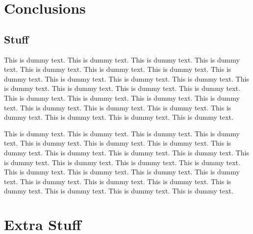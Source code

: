 \documentclass{book}
\begin{document}
\chapter{Conclusions}\label{Conclusions}

\section{Stuff}
This is dummy text. This is dummy text. This is dummy text. This is dummy text. This is dummy text. This is dummy text. This is dummy text. This is dummy text. This is dummy text. This is dummy text. This is dummy text. This is dummy text. This is dummy text. This is dummy text. This is dummy text. This is dummy text. This is dummy text. This is dummy text. This is dummy text. This is dummy text. This is dummy text. This is dummy text. This is dummy text. This is dummy text. This is dummy text. This is dummy text. 

This is dummy text. This is dummy text. This is dummy text. This is dummy text. This is dummy text. This is dummy text. This is dummy text. This is dummy text. This is dummy text. This is dummy text. This is dummy text. This is dummy text. This is dummy text. This is dummy text. This is dummy text. This is dummy text. This is dummy text. This is dummy text. This is dummy text. This is dummy text. This is dummy text. This is dummy text. This is dummy text. This is dummy text. This is dummy text. This is dummy text. 


\appendix

\noappendicestocpagenum	 %
\addappheadtotoc	%

\renewcommand{\theequation}{A-\arabic{equation}} %
\setcounter{equation}{0}  %

\renewcommand{\thesection}{A-\arabic{section}} %
\setcounter{section}{0}  %

\renewcommand{\thetable}{A-\arabic{table}} %
\setcounter{table}{0}  %

\chapter{Extra Stuff}\label{Extra}
\end{document}
